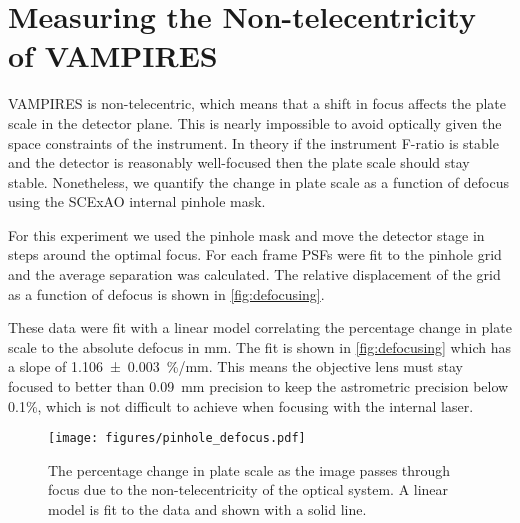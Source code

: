 \section{Measuring the Non-telecentricity of VAMPIRES}\label{sec:telecentricity}

VAMPIRES is non-telecentric, which means that a shift in focus affects the plate scale in the detector plane. This is nearly impossible to avoid optically given the space constraints of the instrument. In theory if the instrument F-ratio is stable and the detector is reasonably well-focused then the plate scale should stay stable. Nonetheless, we quantify the change in plate scale as a function of defocus using the SCExAO internal pinhole mask.

For this experiment we used the pinhole mask and move the detector stage in steps around the optimal focus. For each frame PSFs were fit to the pinhole grid and the average separation was calculated. The relative displacement of the grid as a function of defocus is shown in \autoref{fig:defocusing}.

These data were fit with a linear model correlating the percentage change in plate scale to the absolute defocus in \si{\milli\meter}. The fit is shown in \autoref{fig:defocusing} which has a slope of \SI{1.106(3)}{\%/\milli\meter}. This means the objective lens must stay focused to better than \SI{0.09}{\milli\meter} precision to keep the astrometric precision below 0.1\%, which is not difficult to achieve when focusing with the internal laser.

\begin{figure}
    \centering
    \texttt{[image: figures/pinhole\_defocus.pdf]}
    \caption{The percentage change in plate scale as the image passes through focus due to the non-telecentricity of the optical system. A linear model is fit to the data and shown with a solid line.\label{fig:defocusing}}
\end{figure}
